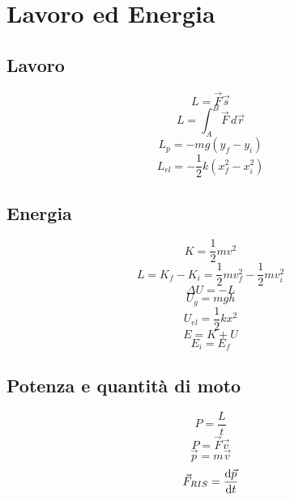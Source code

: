 \documentclass[../../fisica]{subfiles}
\begin{document}
    \chapter{Lavoro ed Energia}

        \section*{Lavoro}
        
            \[ L = \vec{F} \vec{s}  \] %
            \[ L = \int_A^B\vec{F} \, d\vec{r}  \] %
            \[ L_{p} = -mg(y_f - y_i)  \] %
            \[ L_{el} = - \frac{1}{2} k (x_f^2 - x_i^2)  \] %
           
        \section*{Energia}

            \[ K = \frac{1}{2} m v^2  \] %
            \[ L = K_f - K_i  = \frac{1}{2} m v_f^2 - \frac{1}{2} m v_i^2 \] %
            \[ \Delta U = - L \] %
            \[ U_g = m g h \] %
            \[ U_{el} = \frac{1}{2} k x^2 \] %
            \[ E = K + U \] %
            \[ E_i = E_f \] %

        \section*{Potenza e quantità di moto}

            \[ P = \frac{L}{t} \] %
            \[ P = \vec{F} \vec{v} \] %
            \[ \vec{p} = m\vec{v} \] %
            \[ \vec{F}_{RIS} = \dv{\vec{p}}{t}\] %
\end{document}
